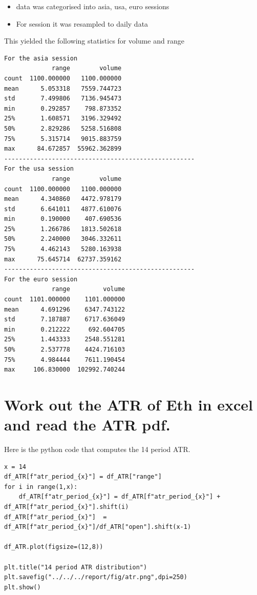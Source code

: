 \begin{itemize}
\item data was categorised into asia, usa, euro sessions
\item For session it was resampled to daily data
\end{itemize}

This yielded the following statistics  for volume and range

\begin{verbatim}
For the asia session
             range        volume
count  1100.000000   1100.000000
mean      5.053318   7559.744723
std       7.499806   7136.945473
min       0.292857    798.873352
25%       1.608571   3196.329492
50%       2.829286   5258.516808
75%       5.315714   9015.883759
max      84.672857  55962.362899
----------------------------------------------------
For the usa session
             range        volume
count  1100.000000   1100.000000
mean      4.340860   4472.978179
std       6.641011   4877.610076
min       0.190000    407.690536
25%       1.266786   1813.502618
50%       2.240000   3046.332611
75%       4.462143   5280.163938
max      75.645714  62737.359162
----------------------------------------------------
For the euro session
             range         volume
count  1101.000000    1101.000000
mean      4.691296    6347.743122
std       7.187887    6717.636049
min       0.212222     692.604705
25%       1.443333    2548.551281
50%       2.537778    4424.716103
75%       4.984444    7611.190454
max     106.830000  102992.740244
\end{verbatim}

\section{ Work out the ATR of Eth in excel and read the ATR pdf.}
Here is the python code that computes the 14 period ATR. 
\begin{verbatim}
x = 14
df_ATR[f"atr_period_{x}"] = df_ATR["range"]
for i in range(1,x):
    df_ATR[f"atr_period_{x}"] = df_ATR[f"atr_period_{x}"] +  df_ATR[f"atr_period_{x}"].shift(i)
df_ATR[f"atr_period_{x}"]  = df_ATR[f"atr_period_{x}"]/df_ATR["open"].shift(x-1)

df_ATR.plot(figsize=(12,8))

plt.title("14 period ATR distribution")
plt.savefig("../../../report/fig/atr.png",dpi=250)
plt.show()
\end{verbatim}



